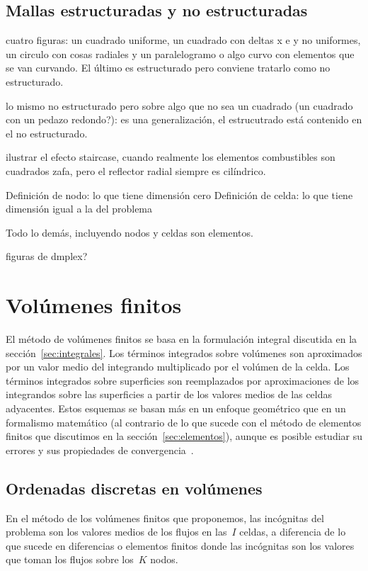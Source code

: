 \subsection{Mallas estructuradas y no estructuradas} %

cuatro figuras: un cuadrado uniforme, un cuadrado con deltas x e y no uniformes, un circulo con cosas radiales y un paralelogramo o algo curvo con elementos que se van curvando. El último es estructurado pero conviene tratarlo como no estructurado.

lo mismo no estructurado pero sobre algo que no sea un cuadrado (un cuadrado con un pedazo redondo?): es una generalización, el estrucutrado está contenido en el no estructurado.

ilustrar el efecto staircase, cuando realmente los elementos combustibles son cuadrados zafa, pero el reflector radial siempre es cilíndrico.

Definición de nodo: lo que tiene dimensión cero
Definición de celda: lo que tiene dimensión igual a la del problema

Todo lo demás, incluyendo nodos y celdas son elementos.

figuras de dmplex?

\lipsum[4]


\section{Volúmenes finitos} %

El método de volúmenes finitos se basa en la formulación integral discutida en la sección~\ref{sec:integrales}. Los términos integrados sobre volúmenes son aproximados por un valor medio del integrando multiplicado por el volúmen de la celda. Los términos integrados sobre superficies son reemplazados por aproximaciones de los integrandos sobre las superficies a partir de los valores medios de las celdas adyacentes. Estos esquemas se basan más en un enfoque geométrico que en un formalismo matemático (al contrario de lo que sucede con el método de elementos finitos que discutimos en la sección~\ref{sec:elementos}), aunque es posible estudiar su errores y sus propiedades de convergencia~\cite{bookevol}.


\subsection{Ordenadas discretas en volúmenes} %

En el método de los volúmenes finitos que proponemos, las incógnitas del problema son los valores medios de los flujos en las~$I$ celdas, a diferencia de lo que sucede en diferencias o elementos finitos donde las incógnitas son los valores que toman los flujos sobre los~$K$ nodos.


